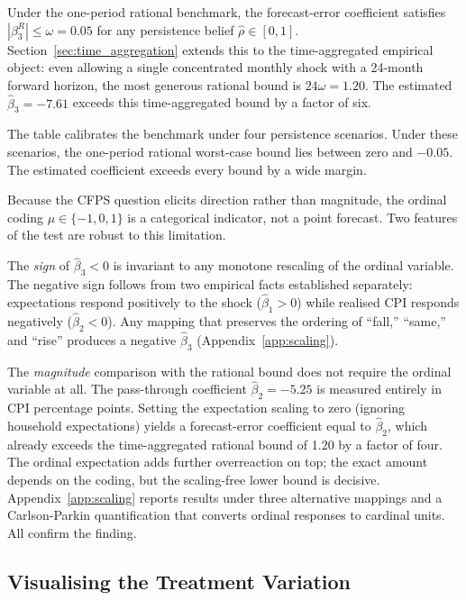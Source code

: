 Under the one-period rational benchmark, the forecast-error
coefficient satisfies
$|\beta_3^R| \leq \omega = 0.05$ for any persistence belief
$\hat{\rho} \in [0,1]$.
Section~\ref{sec:time_aggregation} extends this to the
time-aggregated empirical object: even allowing a single
concentrated monthly shock with a 24-month forward horizon,
the most generous rational bound is $24\omega = 1.20$.
The estimated $\hat{\beta}_3 = -7.61$ exceeds this
time-aggregated bound by a factor of six.

The table calibrates the benchmark under four persistence
scenarios.
Under these scenarios, the one-period rational worst-case bound
lies between zero and $-0.05$.
The estimated coefficient exceeds every bound by a wide margin.

Because the CFPS question elicits direction rather than
magnitude, the ordinal coding $\mu \in \{-1, 0, 1\}$ is a
categorical indicator, not a point forecast.
Two features of the test are robust to this limitation.

The \emph{sign} of $\hat{\beta}_3 < 0$ is invariant to
any monotone rescaling of the ordinal variable.
The negative sign follows from two empirical facts established
separately: expectations respond positively to the shock
($\hat{\beta}_1 > 0$) while realised CPI responds negatively
($\hat{\beta}_2 < 0$).
Any mapping that preserves the ordering of ``fall,'' ``same,''
and ``rise'' produces a negative $\hat{\beta}_3$
(Appendix~\ref{app:scaling}).

The \emph{magnitude} comparison with the rational bound
does not require the ordinal variable at all.
The pass-through coefficient $\hat{\beta}_2 = -5.25$ is
measured entirely in CPI percentage points.
Setting the expectation scaling to zero (ignoring household
expectations) yields a forecast-error coefficient equal to
$\hat{\beta}_2$, which already exceeds the time-aggregated
rational bound of 1.20 by a factor of four.
The ordinal expectation adds further overreaction on top;
the exact amount depends on the coding, but the scaling-free
lower bound is decisive.
Appendix~\ref{app:scaling} reports results under three
alternative mappings and a Carlson-Parkin quantification that
converts ordinal responses to cardinal units.
All confirm the finding.

\subsection{Visualising the Treatment Variation}%
\label{sec:event_study}

